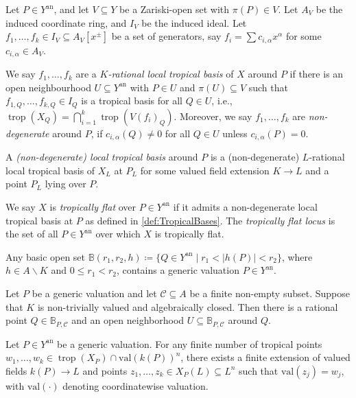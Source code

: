 \documentclass[10pt,a4paper]{amsart}
\DeclareMathOperator{\Trop}{trop}
\DeclareMathOperator{\trop}{trop}
\newcommand{\an}{{\mathrm{an}}}
\begin{document}
\begin{definition}\label{def:TropicalBases}
  Let $P\in Y^\an$, and let $V\subseteq Y$ be a Zariski-open set with $\pi(P)\in V$. Let $A_V$ be the induced coordinate ring, and $I_V$ be the induced ideal.  Let $f_1,\dots,f_k\in I_V\subseteq A_V[x^\pm]$ be a set of generators, say $f_i=\sum c_{i,\alpha}x^{\alpha}$ for some $c_{i,\alpha}\in A_V$.

  We say $f_1,\dots,f_k$ are a \emph{$K$-rational local tropical basis} of $X$ around $P$ if there is an open neighbourhood $U\subseteq Y^\an$ with $P\in U$ and $\pi(U)\subseteq V$ such that $f_{1,Q},\dots,f_{k,Q}\in I_Q$ is a tropical basis for all $Q\in U$, i.e., $\Trop(X_{Q})=\bigcap_{i=1}^{k} \Trop(V(f_{i})_{Q})$. Moreover, we say $f_1,\dots,f_k$ are \emph{non-degenerate} around $P$, if $c_{i,\alpha}(Q)\neq 0$ for all $Q\in U$ unless $c_{i,\alpha}(P)=0$.

  A \emph{(non-degenerate) local tropical basis} around $P$ is a (non-degenerate) $L$-rational local tropical basis of $X_L$ at $P_L$ for some valued field extension $K\to{L}$ and a point $P_{L}$ lying over $P$.
\end{definition}

\begin{definition}
  \label{def:TropicallyFlat}
  We say $X$ is \emph{tropically flat} over $P\in{Y^{\mathrm{an}}}$ if it admits a non-degenerate local tropical basis at $P$ as defined in \cref{def:TropicalBases}. The \emph{tropically flat locus} is the set of all $P\in{Y^{\mathrm{an}}}$ over which $X$ is tropically flat.
\end{definition}

\begin{lemma}\label{lem:GenericValuations3}
  Any basic open set $\mathbb{B}(r_{1},r_{2},h)\coloneqq \{Q\in Y^\an\mid r_1<|h(P)|<r_2\}$, where $h\in {A\backslash K}$ and $0\leq r_{1}<r_{2}$, contains a generic valuation $P\in Y^{\an}$.
\end{lemma}

\begin{lemma}\label{lem:FindingRationalPoints}
  Let $P$ be a generic valuation and let $\mathcal{C}\subseteq A$ be a finite non-empty subset. Suppose that $K$ is non-trivially valued and algebraically closed. Then there is a rational point $Q\in \mathbb{B}_{P,\mathcal{C}}$ and an open neighborhood $U\subseteq \mathbb{B}_{P,\mathcal{C}}$ around $Q$.
\end{lemma}

\begin{lemma}\label{lem:ExtendValuationPoints}
  Let $P\in Y^{\an}$ be a generic valuation. For any finite number of tropical points $w_{1},\dots, w_{k}\in\trop(X_{P})\cap \mathrm{val}(k(P))^n$, there exists a finite extension of valued fields $k(P)\to L$ and points $z_1,\dots,z_k\in X_{P}(L)\subseteq L^n$ such that
  \begin{math}
    \mathrm{val}(z_{j})=w_{j},
  \end{math}
  with $\mathrm{val}(\cdot)$ denoting coordinatewise valuation.
\end{lemma}
\end{document}
